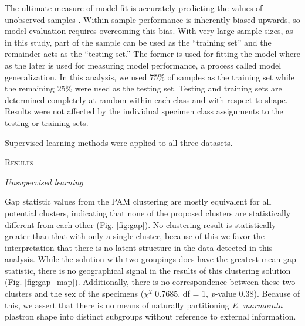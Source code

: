 \documentclass[12pt,letterpaper]{article}
\renewcommand{\section}[1]{%
\bigskip
\begin{center}
\begin{Large}
\normalfont\scshape #1
\medskip
\end{Large}
\end{center}}
\renewcommand{\subsection}[1]{%
\bigskip
\begin{center}
\begin{large}
\normalfont\itshape #1
\end{large}
\end{center}}
\begin{document}
The ultimate measure of model fit is accurately predicting the values of unobserved samples \citep{Hastie2009,Kuhn2013}. Within-sample performance is inherently biased upwards, so model evaluation requires overcoming this bias. With very large sample sizes, as in this study, part of the sample can be used as the ``training set'' and the remainder acts as the ``testing set.'' The former is used for fitting the model where as the later is used for measuring model performance, a process called model generalization. In this analysis, we used 75\% of samples as the training set while the remaining 25\% were used as the testing set. Testing and training sets are determined completely at random within each class and with respect to shape. Results were not affected by the individual specimen class assignments to the testing or training sets.

Supervised learning methods were applied to all three datasets.


\section{Results}

\subsection{Unsupervised learning}

Gap statistic values from the PAM clustering are mostly equivalent for all potential clusters, indicating that none of the proposed clusters are statistically different from each other (Fig. \ref{fig:gap}). No clustering result is statistically greater than that with only a single cluster, because of this we favor the interpretation that there is no latent structure in the data detected in this analysis. While the solution with two groupings does have the greatest mean gap statistic, there is no geographical signal in the results of this clustering solution (Fig. \ref{fig:gap_map}). Additionally, there is no correspondence between these two clusters and the sex of the specimens (\(\chi^{2}\) 0.7685, df = 1, \textit{p}-value 0.38). Because of this, we assert that there is no means of naturally partitioning \textit{E. marmorata} plastron shape into distinct subgroups without reference to external information. 
\end{document}
